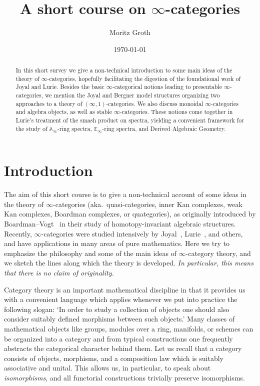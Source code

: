 \documentclass{amsart}
\title{A short course on $\infty$-categories}
\author[M. Groth]{Moritz Groth}
\date{\today}
\newcommand{\Aoo}{\mathbb{A}_\infty}
\newcommand{\Eoo}{\mathbb{E}_\infty}
\begin{document}
\begin{abstract}
In this short survey we give a non-technical introduction to some main ideas of the theory of $\infty$-categories, hopefully facilitating the digestion of the foundational work of Joyal and Lurie. Besides the basic $\infty$-categorical notions leading to presentable $\infty$-categories, we mention the Joyal and Bergner model structures organizing two approaches to a theory of $(\infty,1)$-categories. We also discuss monoidal $\infty$-categories and algebra objects, as well as stable $\infty$-categories. These notions come together in Lurie's treatment of the smash product on spectra, yielding a convenient framework for the study of $\Aoo$-ring spectra, $\Eoo$-ring spectra, and Derived Algebraic Geometry.
\end{abstract}

\maketitle
\setcounter{section}{-1}

\tableofcontents

\section{Introduction}
\label{sec:intro}

The aim of this short course is to give a non-technical account of some ideas in the theory of $\infty$-categories (aka.~quasi-categories, inner Kan complexes, weak Kan complexes, Boardman complexes, or quategories), as originally introduced by Boardman--Vogt~\cite[p.102]{boardman-vogt} in their study of homotopy-invariant algebraic structures. Recently, $\infty$-categories were studied intensively by Joyal~\cite{joyal:I-II,joyal:quasi-kan,joyal:barca}, Lurie~\cite{HTT,DAGI,DAGII,DAGIII}, and others, and have applications in many areas of pure mathematics. Here we try to emphasize the philosophy and some of the main ideas of $\infty$-category theory, and we sketch the lines along which the theory is developed. \emph{In particular, this means that there is no claim of originality.}
 
Category theory is an important mathematical discipline in that it provides us with a convenient language which applies whenever we put into practice the following slogan: `In order to study a collection of objects one should also consider suitably defined morphisms between such objects.' Many classes of mathematical objects like groups, modules over a ring, manifolds, or schemes can be organized into a category and from typical constructions one frequently abstracts the categorical character behind them. Let us recall that a category consists of objects, morphisms, and a composition law which is suitably associative and unital. This allows us, in particular, to speak about \emph{isomorphisms}, and all functorial constructions trivially preserve isomorphisms. 
\end{document}
